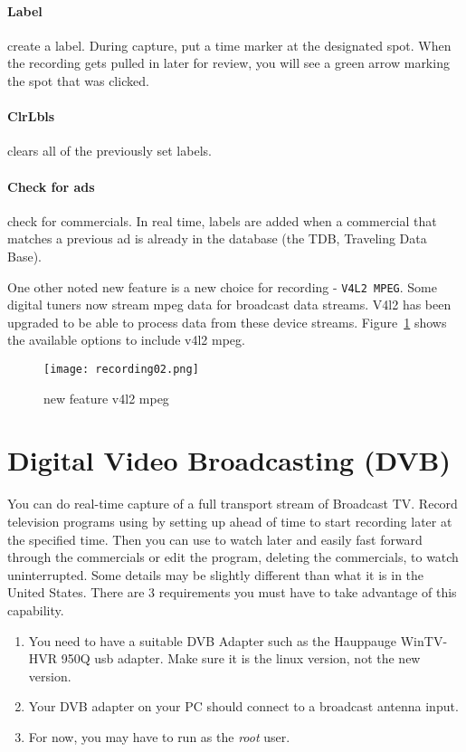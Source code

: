 \paragraph{Label} create a label.  During capture, put a time marker at the designated spot.  When the recording 
gets pulled in later for review, you will see a green arrow marking the spot that was clicked.
\paragraph{ClrLbls} clears all of the previously set labels.
\paragraph{Check for ads} check for commercials.  In real time, labels are added when a commercial that matches
a previous ad is already in the database (the TDB, Traveling Data Base).

One other noted new feature is a new choice for recording -  \texttt{V4L2 MPEG}.  Some digital tuners now stream mpeg data for broadcast data streams.  V4l2 has been upgraded to be able to process data from these device streams.  Figure~\ref{fig:recording02} shows the available options to include v4l2 mpeg.

\begin{figure}[htpb]
    \centering
    \texttt{[image: recording02.png]}
    \caption{new feature v4l2 mpeg}
    \label{fig:recording02}
\end{figure}

\section{Digital Video Broadcasting (DVB)}%
\label{sec:digital_video_broadcasting}

You can do real-time capture of a full transport stream of Broadcast TV.  Record television programs using \CGG{} by setting up ahead of time to start recording later at the specified time.  Then you can use \CGG{} to watch later and easily fast forward through the commercials or edit the program, deleting the commercials, to watch uninterrupted.  Some details may be slightly different than what it is in the United States.  There are 3 requirements you must have to take advantage of this capability.

\begin{enumerate}
    \item You need to have a suitable DVB Adapter such as the Hauppauge WinTV-HVR 950Q usb adapter. Make sure it is the linux version, not the new version.
    \item Your DVB adapter on your PC should connect to a broadcast antenna input.
    \item For now, you may have to run as the \textit{root} user.
\end{enumerate}

